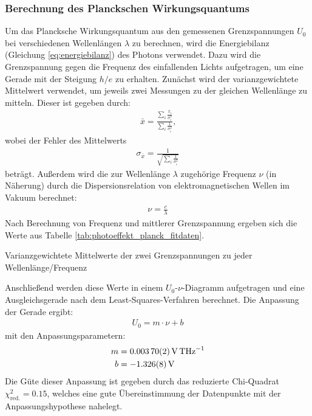 \documentclass[11pt, a4paper]{article}
\numberwithin{equation}{section}
\begin{document}
\subsubsection{Berechnung des Planckschen Wirkungsquantums}
Um das Plancksche Wirkungsquantum aus den gemessenen Grenzspannungen $U_0$ bei verschiedenen Wellenlängen $\lambda$ zu berechnen, wird die Energiebilanz (Gleichung \eqref{eq:energiebilanz}) des Photons verwendet.
Dazu wird die Grenzspannung gegen die Frequenz des einfallenden Lichts aufgetragen, um eine Gerade mit der Steigung $h/e$ zu erhalten.
Zunächst wird der varianzgewichtete Mittelwert verwendet, um jeweils zwei Messungen zu der gleichen Wellenlänge zu mitteln.
Dieser ist gegeben durch:
\begin{align*}
\bar{x} = \frac{\sum_i \frac{x_i}{\sigma_i^2}}{\sum_i \frac{1}{\sigma_i^2}}\text{,}
\end{align*}
wobei der Fehler des Mittelwerts
\begin{align*}
\sigma_{\bar{x}} = \frac{1}{\sqrt{\sum_i \frac{1}{\sigma_i^2}}}
\end{align*}
beträgt.
Außerdem wird die zur Wellenlänge $\lambda$ zugehörige Frequenz $\nu$ (in Näherung) durch die Dispersionsrelation von elektromagnetischen Wellen im Vakuum berechnet:
\begin{align*}
	\nu = \frac{c}{\lambda}
\end{align*}
Nach Berechnung von Frequenz und mittlerer Grenzspannung ergeben sich die Werte aus Tabelle \ref{tab:photoeffekt_planck_fitdaten}.
\begin{table}[h]
	\centering
	
	\caption{Varianzgewichtete Mittelwerte der zwei Grenzspannungen zu jeder Wellenlänge/Frequenz}
	\label{tab:photoeffekt_planck_fitdaten}
\end{table}
Anschließend werden diese Werte in einem $U_0$-$\nu$-Diagramm aufgetragen und eine Ausgleichsgerade nach dem Least-Squares-Verfahren berechnet.
Die Anpassung der Gerade ergibt:
\begin{align*}
	U_0 = m \cdot \nu + b
\end{align*}
mit den Anpassungsparametern:
\begin{align*}
	m &= \SI{0.00370 +- 0.00002}{\volt\per\tera\hertz} \\
	b &= \SI{-1.326 +- 0.008}{\volt}
\end{align*}
Die Güte dieser Anpassung ist gegeben durch das reduzierte Chi-Quadrat $\chi_\mathrm{red.}^2 = \num{0,15}$, welches eine gute Übereinstimmung der Datenpunkte mit der Anpassungshypothese nahelegt.
\end{document}
